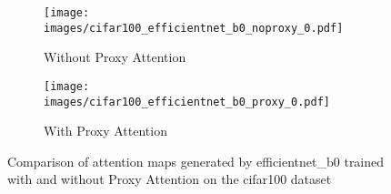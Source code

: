     \begin{figure}[H]
        \centering
        \begin{subfigure}[b]{1\textwidth}
            \texttt{[image: images/cifar100\_efficientnet\_b0\_noproxy\_0.pdf]}
            \caption{Without Proxy Attention}
        \end{subfigure}
        \hfill
        \begin{subfigure}[b]{1\textwidth}
            \texttt{[image: images/cifar100\_efficientnet\_b0\_proxy\_0.pdf]}
            \caption{With Proxy Attention}
        \end{subfigure}
        \caption{Comparison of attention maps generated by efficientnet\_b0 trained with and without Proxy Attention on the cifar100 dataset}
    \end{figure}
    
